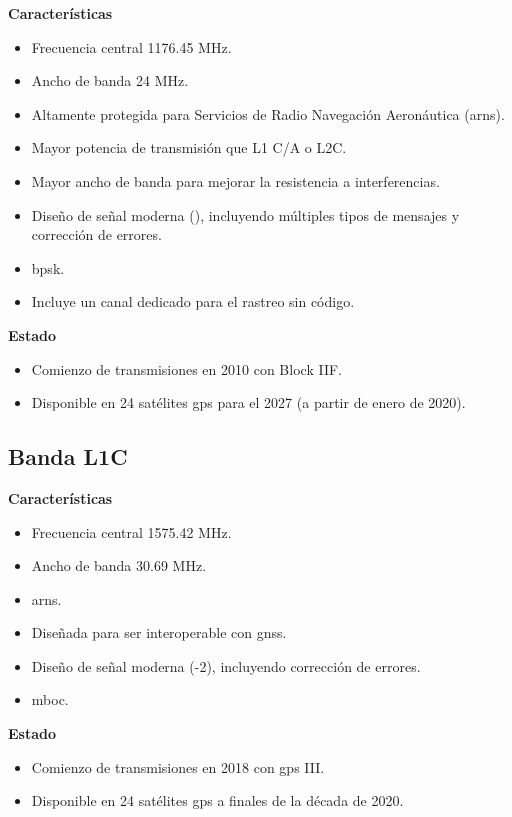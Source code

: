 \begin{justify}
    \textbf{Características}
    \begin{itemize}
        \item Frecuencia central 1176.45 MHz.
        \item Ancho de banda 24 MHz.
        \item Altamente protegida para Servicios de Radio Navegación Aeronáutica (\gls{arns}).
        \item Mayor potencia de transmisión que L1 C/A o L2C.
        \item Mayor ancho de banda para mejorar la resistencia a interferencias.
        \item Diseño de señal moderna (), incluyendo múltiples tipos de mensajes y corrección de errores.
        \item \gls{bpsk}.
        \item Incluye un canal dedicado para el rastreo sin código.
    \end{itemize}

    \textbf{Estado}
    \begin{itemize}
        \item Comienzo de transmisiones en 2010 con Block IIF.
        \item Disponible en 24 satélites \gls{gps} para el 2027 (a partir de enero de 2020).
    \end{itemize}
\end{justify}

\subsection{Banda L1C}

\begin{justify}
    \textbf{Características}
    \begin{itemize}[itemsep=2pt]
        \item Frecuencia central 1575.42 MHz.
        \item Ancho de banda 30.69 MHz.
        \item \gls{arns}.
        \item Diseñada para ser interoperable con \gls{gnss}.
        \item Diseño de señal moderna (-2), incluyendo corrección de errores.
        \item \gls{mboc}.\\
    \end{itemize}

    \noindent\textbf{Estado}
    \begin{itemize}[itemsep=2pt]
        \item Comienzo de transmisiones en 2018 con \gls{gps} III.
        \item Disponible en 24 satélites \gls{gps} a finales de la década de 2020.
    \end{itemize}
\end{justify}

